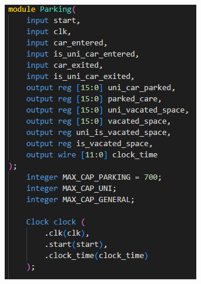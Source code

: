 \documentclass{article}
\begin{document}
\begin{enumerate}[label=\textbf{\alph*)}]
    \begin{figure}[H]
        \centering
        \begin{minipage}{0.4\textwidth}
            \centering
            \includegraphics[width=\textwidth]{Parking1.png}
        \end{minipage}\hfill
        \begin{minipage}{0.5\textwidth}
            \centering

\end{minipage}
\end{figure}
\end{enumerate}
\end{document}
